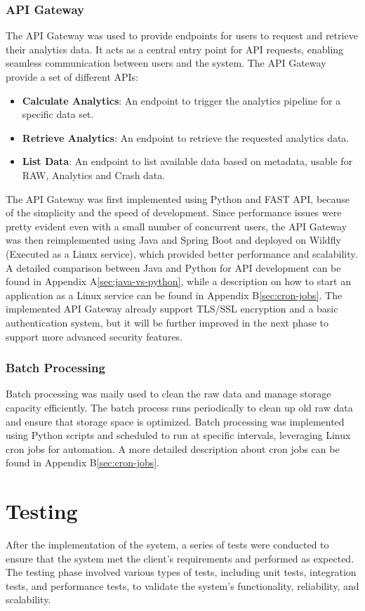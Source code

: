 \subsubsection{API Gateway}
The API Gateway was used to provide endpoints for users to request and retrieve their analytics data. It acts as a central entry point for API requests, enabling seamless communication between users and the system.
The API Gateway provide a set of different APIs:
\begin{itemize}
    \item \textbf{Calculate Analytics}: An endpoint to trigger the analytics pipeline for a specific data set.
    \item \textbf{Retrieve Analytics}: An endpoint to retrieve the requested analytics data.
    \item \textbf{List Data}: An endpoint to list available data based on metadata, usable for RAW, Analytics and Crash data.
\end{itemize}

The API Gateway was first implemented using Python and FAST API, because of the simplicity and the speed of development.
Since performance issues were pretty evident even with a small number of concurrent users, the API Gateway was then reimplemented using Java and Spring Boot and deployed on Wildfly (Executed as a Linux service), which provided better performance and scalability. A detailed comparison between Java and Python for API development can be found in Appendix A\ref{sec:java-vs-python}, while a description on how to start an application as a Linux service can be found in Appendix B\ref{sec:cron-jobs}.
The implemented API Gateway already support TLS/SSL encryption and a basic authentication system, but it will be further improved in the next phase to support more advanced security features.

\subsubsection{Batch Processing}
Batch processing was maily used to clean the raw data and manage storage capacity efficiently. The batch process runs periodically to clean up old raw data and ensure that storage space is optimized. Batch processing was implemented using Python scripts and scheduled to run at specific intervals, leveraging Linux cron jobs for automation. A more detailed description about cron jobs can be found in Appendix B\ref{sec:cron-jobs}.

\section{Testing}
\label{sec:testing}
After the implementation of the system, a series of tests were conducted to ensure that the system met the client's requirements and performed as expected. The testing phase involved various types of tests, including unit tests, integration tests, and performance tests, to validate the system's functionality, reliability, and scalability.

